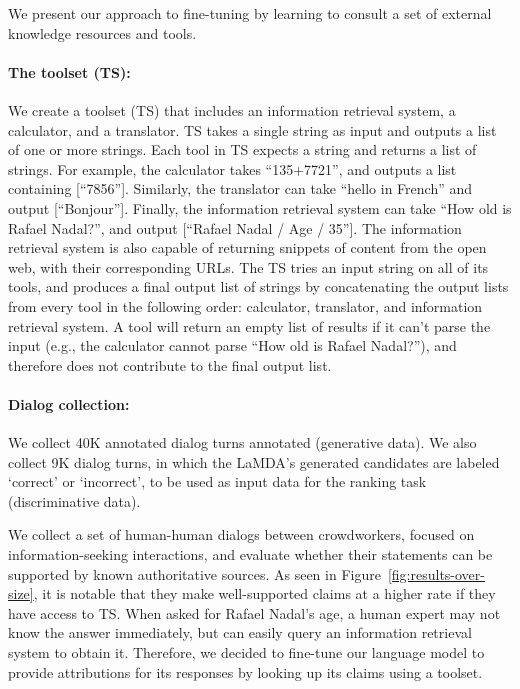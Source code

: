 \documentclass{article}
\def\knowledgetool{information retrieval system\xspace}
\begin{document}
We present our approach to fine-tuning by learning to consult a set of external knowledge resources and tools.

\paragraph{The toolset (TS):}We create a toolset (TS) that includes an \knowledgetool, a calculator, and a translator. TS takes a single string as input and outputs a list of one or more strings. Each tool in TS expects a string and returns a list of strings. For example, the calculator takes ``135+7721'', and outputs a list containing [``7856''].  Similarly, the translator can take ``hello in French'' and output [``Bonjour'']. Finally, the information retrieval system can take ``How old is Rafael Nadal?'', and output [``Rafael Nadal / Age / 35'']. The information retrieval system is also capable of returning snippets of content from the open web, with their corresponding URLs. The TS tries an input string on all of its tools, and produces a final output list of strings by concatenating the output lists from every tool in the following order: calculator, translator, and information retrieval system. A tool will return an empty list of results if it can't parse the input (e.g., the calculator cannot parse ``How old is Rafael Nadal?''), and therefore does not contribute to the final output list.

\paragraph{Dialog collection:}We collect 40K annotated dialog turns annotated (generative data). We also collect 9K dialog turns, in which the LaMDA’s generated candidates are labeled ‘correct’ or ‘incorrect’, to be used as input data for the ranking task (discriminative data).

We collect a set of human-human dialogs between crowdworkers, focused on information-seeking interactions, and evaluate whether their statements can be supported by known authoritative sources. As seen in Figure~\ref{fig:results-over-size}, it is notable that they make well-supported claims at a higher rate if they have access to TS. When asked for Rafael Nadal's age, a human expert may not know the answer immediately, but can easily query an \knowledgetool to obtain it. Therefore, we decided to fine-tune our language model to provide attributions for its responses by looking up its claims using a toolset.
\end{document}
